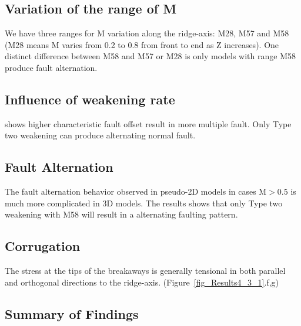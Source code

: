 \subsection{Variation of the range of M}
We have three ranges for M variation along the ridge-axis: M28, M57 and M58 (M28 means M varies from 0.2 to 0.8 from front to end as Z increases). One distinct difference between M58 and M57 or M28 is only models with range M58 produce fault alternation.

\subsection{Influence of weakening rate}
\citep{Lavier2000} shows higher characteristic fault offset result in more multiple fault. Only Type two weakening can produce alternating normal fault.
\subsection{Fault Alternation}
The fault alternation behavior observed in pseudo-2D models in cases M$>0.5$ is much more complicated in 3D models. The results shows that only Type two weakening with M58 will result in a alternating faulting pattern. 
\subsection{Corrugation}
The stress at the tips of the breakaways is generally tensional in both parallel and orthogonal directions to the ridge-axis. (Figure~\ref{fig_Results4_3_1}.f,g)
\subsection{Summary of Findings}
